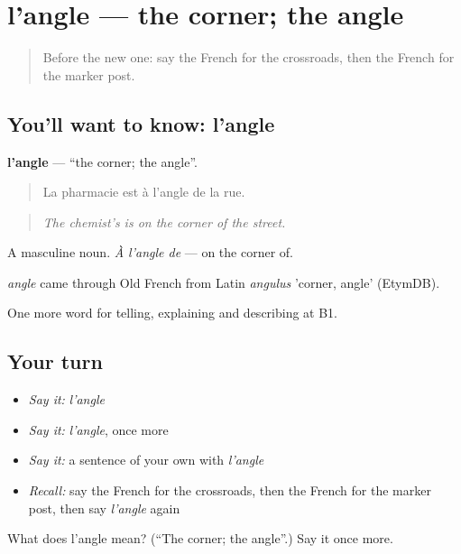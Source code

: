 \section[l'angle]{l'angle — the corner; the angle}

\label{lesson:FR-C435-angle}



\begin{quote}
Before the new one: say the French for the crossroads, then the French for the marker post.
\end{quote}

\subsection*{You'll want to know: l'angle}
\textbf{l'angle} — \textquotedblleft{}the corner; the angle\textquotedblright{}.

\begin{quote}
La pharmacie est à l'angle de la rue.
\end{quote}

\begin{quote}
\emph{The chemist's is on the corner of the street.}
\end{quote}

A masculine noun. \emph{À l'angle de} — on the corner of.

\begin{cousinweb}
\emph{angle} came through Old French from Latin \emph{angulus} 'corner, angle' (EtymDB).
\end{cousinweb}

\begin{grammarlens}[title={What you've built}]
One more word for telling, explaining and describing at B1.
\end{grammarlens}

\subsection*{Your turn}
\begin{itemize}
\raggedright
  \item \emph{Say it:} \emph{l'angle}
  \item \emph{Say it:} \emph{l'angle}, once more
  \item \emph{Say it:} a sentence of your own with \emph{l'angle}
  \item \emph{Recall:} say the French for the crossroads, then the French for the marker post, then say \emph{l'angle} again
\end{itemize}

\begin{tcolorbox}[breakable,colback=teal!4,colframe=teal!35!black,title={Before you move on}]
What does l'angle mean? (\textquotedblleft{}The corner; the angle\textquotedblright{}.) Say it once more.
\end{tcolorbox}
